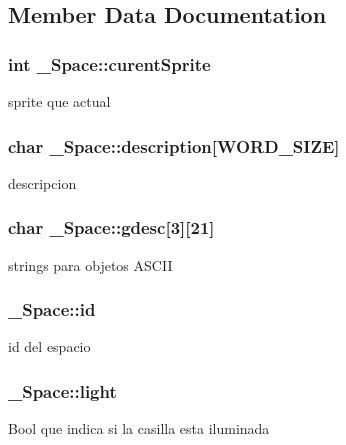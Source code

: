 \subsection{Member Data Documentation}
\subsubsection[{\texorpdfstring{curent\+Sprite}{curentSprite}}]{\setlength{\rightskip}{0pt plus 5cm}int \+\_\+\+Space\+::curent\+Sprite}\hypertarget{struct__Space_a36bf40fe118f520ea514bf1a3a106d9f}{}\label{struct__Space_a36bf40fe118f520ea514bf1a3a106d9f}
sprite que actual 
\subsubsection[{\texorpdfstring{description}{description}}]{\setlength{\rightskip}{0pt plus 5cm}char \+\_\+\+Space\+::description\mbox{[}{\bf W\+O\+R\+D\+\_\+\+S\+I\+ZE}\mbox{]}}\hypertarget{struct__Space_a2a50aacb78d1d0f65f5b14f94ed81d80}{}\label{struct__Space_a2a50aacb78d1d0f65f5b14f94ed81d80}
descripcion 
\subsubsection[{\texorpdfstring{gdesc}{gdesc}}]{\setlength{\rightskip}{0pt plus 5cm}char \+\_\+\+Space\+::gdesc\mbox{[}3\mbox{]}\mbox{[}21\mbox{]}}\hypertarget{struct__Space_a0a71c4c0a4a1698f7d860ba5b80beb7f}{}\label{struct__Space_a0a71c4c0a4a1698f7d860ba5b80beb7f}
strings para objetos A\+S\+C\+II 
\subsubsection[{\texorpdfstring{id}{id}}]{ \+\_\+\+Space\+::id}\hypertarget{struct__Space_a70cb461deb9ac073e401b607339b567f}{}\label{struct__Space_a70cb461deb9ac073e401b607339b567f}
id del espacio 
\subsubsection[{\texorpdfstring{light}{light}}]{ \+\_\+\+Space\+::light}\hypertarget{struct__Space_a15f20d8ccdec846b9a4f77464748bff5}{}\label{struct__Space_a15f20d8ccdec846b9a4f77464748bff5}
Bool que indica si la casilla esta iluminada 

